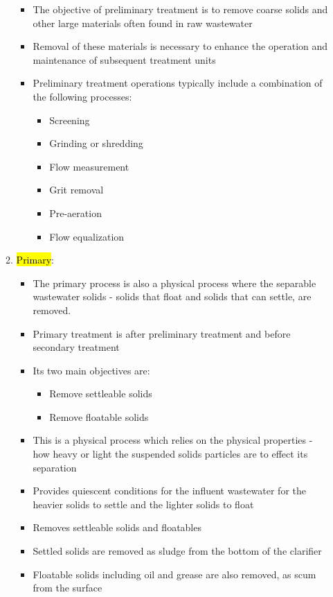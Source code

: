 \begin{itemize}
\begin{enumerate}
			
		\begin{itemize}
		\item The objective of preliminary treatment is to remove coarse solids and other large materials often found in raw wastewater
		\item Removal of these materials is necessary to enhance the operation and maintenance of subsequent treatment units\\
		\item Preliminary treatment operations typically include a combination of the following processes:
			\begin{itemize}
			\item Screening
			\item Grinding or shredding
			\item Flow measurement
			\item Grit removal
			\item Pre-aeration
			\item Flow equalization
			\end{itemize}
		\end{itemize}
\item \hl{Primary}:
		\begin{itemize}
		\item   The primary process is also a physical process where the separable wastewater solids - solids that float and 			solids that can settle, are removed.
		\item Primary treatment is after preliminary treatment and before secondary treatment
		\item Its two main objectives are: 
			\begin{itemize}
			\item Remove settleable solids
			\item Remove floatable solids
			\end{itemize}
		\item This is a physical process which relies on the physical properties - how heavy or light the suspended solids 				particles are to effect its separation
		\item Provides quiescent conditions for the influent wastewater for the heavier solids to settle and the lighter 				solids to float
		\item Removes settleable solids and floatables
		\item Settled solids are removed as sludge from the bottom of the clarifier
		\item Floatable solids including oil and grease are also removed, as scum from the surface

\end{itemize}
\end{enumerate}
\end{itemize}
